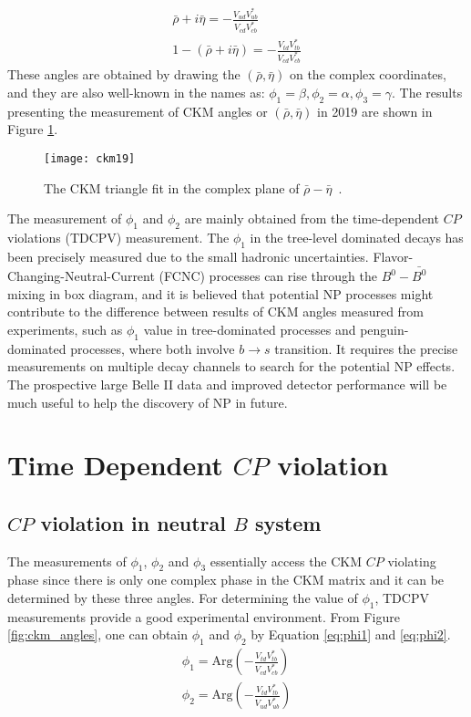 \begin{eqnarray}
\bar{\rho}+i\bar{\eta}=- \frac{V_{ud}V^*_{ub}}{V_{cd}V^*_{cb}}\label{eq:ckm-rho1}\\
1-(\bar{\rho}+i\bar{\eta})=-\frac{V_{td}V^*_{tb}}{V_{cd}V^*_{cb}}\label{eq:ckm-rho2}
\end{eqnarray}
These angles are obtained by drawing the $(\bar{\rho},\bar{\eta})$ on the complex coordinates, and they are also well-known in the names as: $\phi_1=\beta,\phi_2=\alpha,\phi_3=\gamma$. The results presenting the measurement of CKM angles or $(\bar{\rho},\bar{\eta})$ in 2019 are shown in Figure \ref{fig:ckm19}.
\begin{figure}[htbp]
	\centering
	\texttt{[image: ckm19]}
	\caption{The CKM triangle fit in the complex plane of $\bar{\rho}-\bar{\eta}$~\cite{ckmfitter}.}
	\label{fig:ckm19}
\end{figure}

The measurement of $\phi_1$ and $\phi_2$ are mainly obtained from the time-dependent $CP$ violations (TDCPV) measurement. The $\phi_1$ in the tree-level dominated decays has been precisely measured due to the small hadronic uncertainties. Flavor-Changing-Neutral-Current (FCNC) processes can rise through the $B^0-\bar{B^0}$ mixing in box diagram, and it is believed that potential NP processes might contribute to the difference between results of CKM angles measured from experiments, such as $\phi_1$ value in tree-dominated processes and penguin-dominated processes, where both involve $b\to s$ transition. It requires the precise measurements on multiple decay channels to search for the potential NP effects. The prospective large Belle II data and improved detector performance will be much useful to help the discovery of NP in future. 

\section{Time Dependent $CP$ violation}
\subsection{ $CP$ violation in neutral $B$ system}
The measurements of $\phi_1$, $\phi_2$ and $\phi_3$ essentially access the CKM $CP$ violating phase since there is only one complex phase in the CKM matrix and it can be determined by these three angles. 
For determining the value of $\phi_1$, TDCPV measurements provide a good experimental environment.  
From Figure \ref{fig:ckm_angles}, one can obtain $\phi_1$ and $\phi_2$ by Equation \ref{eq:phi1} and \ref{eq:phi2}.
\begin{eqnarray}
\phi_1=\text{Arg}(-\frac{V_{td}V^*_{tb}}{V_{cd}V^*_{cb}}) \label{eq:phi1}\\
\phi_2=\text{Arg}(-\frac{V_{td}V^*_{tb}}{V_{ud}V^*_{ub}})\label{eq:phi2}
\end{eqnarray}

